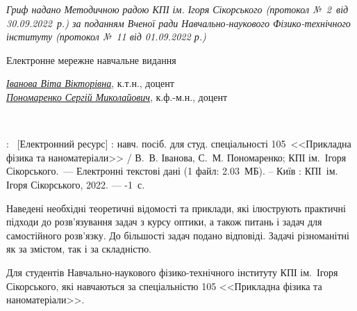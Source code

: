 {\begin{alwayssingle}
		\begin{center}\itshape\small
				Гриф надано Методичною радою КПІ ім. Ігоря Сікорського (протокол №~2~від 30.09.2022~р.) за поданням Вченої ради Навчально-наукового Фізико-технічного інституту (протокол №~11 від 01.09.2022 р.)
		\end{center}
		\begin{center}
			\ifelectronic Електронне мережне навчальне видання \fi
		\end{center}
		\begin{center}
			\href{https://apd.ipt.kpi.ua/blog/author/11}{\itshape Іванова Віта Вікторівна}, к.т.н., доцент \\
			\href{https://apd.ipt.kpi.ua/blog/author/183}{\itshape Пономаренко Сергій Миколайович}, к.ф.-м.н., доцент
		\end{center}
		\begin{center}\bfseries
			\LARGE\sffamily\realtitle \\
			\Large\sffamily\subtitletypeset
		\end{center}
        \begin{center}
            \editiontypeset
        \end{center}
        \noindent%
        \begin{minipage}[t]{\textwidth}\small
                \realtitle: \subtitletypeset\ [Електронний ресурс] : навч. посіб. для студ. спеціальності
                105 <<Прикладна фізика та наноматеріали>> /  В.~В. Іванова, С.~М. Пономаренко; КПІ ім.~Ігоря Сікорського.~--- Електронні текстові дані
            (1 файл: 2.03~МБ). – Київ : КПІ ім. Ігоря Сікорського, 2022. --- \the\numexpr{}-1\relax~с.
        \end{minipage}


		\vfill


        Наведені необхідні теоретичні відомості та приклади, які ілюструють практичні підходи до розв'язування задач з курсу оптики, а також  питань і задач для самостійного розв’язку.  До більшості задач подано відповіді. Задачі різноманітні як за змістом, так і за складністю.

        Для студентів Навчально-наукового фізико-технічного інституту КПІ ім.~Ігоря Сікорського, які навчаються за спеціальністю 105 <<Прикладна фізика та наноматеріали>>.


\end{alwayssingle}}

